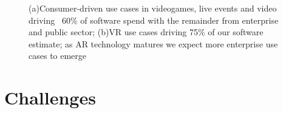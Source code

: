 \documentclass[preprint,12pt]{elsarticle}
\begin{document}
\begin{figure}[!hbp]
	\centering
	\caption{(a)Consumer-driven use cases in videogames, live events and video driving ~60\% of software spend with the remainder from enterprise and public sector; (b)VR use cases driving 75\% of our software estimate; as AR technology matures we expect more enterprise use cases to emerge}
	\label{Predition from Goldman Sachs Global Investment Research}
\end{figure}






\section{Challenges} %
\end{document}
